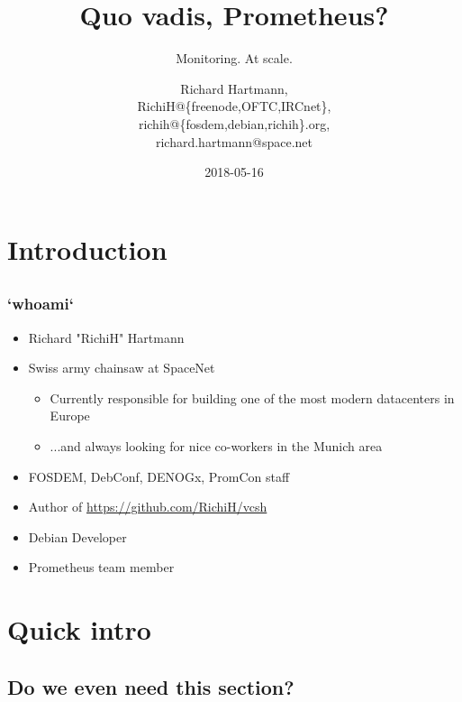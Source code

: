 \documentclass[t]{beamer}
\title{Quo vadis, Prometheus?}
\subtitle{Monitoring. At scale.}
\author{Richard Hartmann,\\
RichiH@\{freenode,OFTC,IRCnet\},\\
richih@\{fosdem,debian,richih\}.org,\\
richard.hartmann@space.net}
\date{2018-05-16}
\begin{document}
\setcounter{tocdepth}{1}

\section{Introduction}

\subsection{}

\begin{frame}
	\titlepage
\end{frame}


\subsection{}

\begin{frame}
	\frametitle{`whoami`}
	\begin{itemize}
		\item Richard "RichiH" Hartmann
		\item Swiss army chainsaw at SpaceNet
		\begin{itemize}
			\item Currently responsible for building one of the most modern datacenters in Europe
			\item ...and always looking for nice co-workers in the Munich area
		\end{itemize}
		\item FOSDEM, DebConf, DENOGx, PromCon staff
		\item Author of \url{https://github.com/RichiH/vcsh}
		\item Debian Developer
		\item Prometheus team member
	\end{itemize}
\end{frame}


\section{Quick intro}

\subsection{Do we even need this section?}
\end{document}
